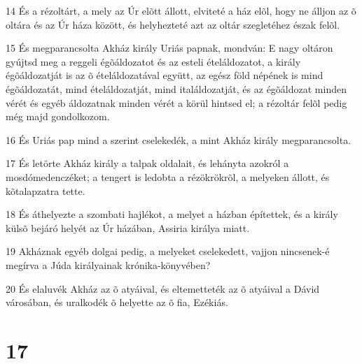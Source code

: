 \par 14 És a rézoltárt, a mely az Úr elõtt állott, elviteté a ház elõl, hogy ne álljon az õ oltára és az Úr háza között, és helyhezteté azt az oltár szegletéhez észak felõl.
\par 15 És megparancsolta Akház király Uriás papnak, mondván: E nagy oltáron gyújtsd meg a reggeli égõáldozatot és az esteli ételáldozatot, a király égõáldozatját is az õ ételáldozatával együtt, az egész föld népének is mind égõáldozatát, mind ételáldozatját, mind italáldozatját, és az égõáldozat minden vérét és egyéb áldozatnak minden vérét a körül hintsed el; a rézoltár felõl pedig még majd gondolkozom.
\par 16 És Uriás pap mind a szerint cselekedék, a mint Akház király megparancsolta.
\par 17 És letörte Akház király a talpak oldalait, és lehányta azokról a mosdómedenczéket; a tengert is ledobta a rézökrökrõl, a melyeken állott, és kõtalapzatra tette.
\par 18 És áthelyezte a szombati hajlékot, a melyet a házban építettek, és a király külsõ bejáró helyét az Úr házában, Assiria királya miatt.
\par 19 Akháznak egyéb dolgai pedig, a melyeket cselekedett, vajjon nincsenek-é megírva a Júda királyainak krónika-könyvében?
\par 20 És elaluvék Akház az õ atyáival, és eltemetteték az õ atyáival a Dávid városában, és uralkodék õ helyette az õ fia,  Ezékiás.

\chapter{17}

